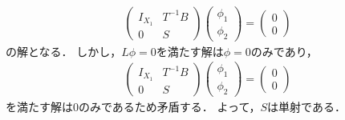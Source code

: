 \begin{Proof}
\begin{align*}
	\left( \begin{array}{cc}
		I_{X_1} & T^{-1} B \\
		0 & S
	\end{array} \right) \left( \begin{array}{c}
		\phi_1 \\
		\phi_2
	\end{array} \right) = \left( \begin{array}{c}
		0 \\
		0
	\end{array} \right)
\end{align*}
の解となる．
しかし，$L \phi = 0$を満たす解は$\phi = 0$のみであり，
\begin{align*}
	\left( \begin{array}{cc}
		I_{X_1} & T^{-1} B \\
		0 & S
	\end{array} \right) \left( \begin{array}{c}
		\phi_1 \\
		\phi_2
	\end{array} \right) = \left( \begin{array}{c}
		0 \\
		0
	\end{array} \right)
\end{align*}
を満たす解は$0$のみであるため矛盾する．
よって，$S$は単射である．


\end{Proof}
